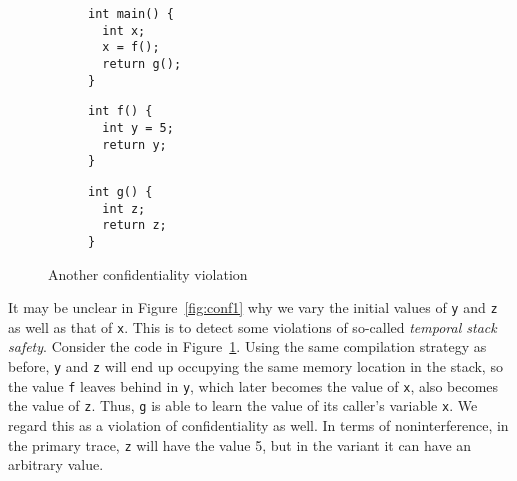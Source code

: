 \documentclass[10pt,conference]{ieeetran}%
\theoremstyle{definition}
\begin{document}
\begin{figure}
\begin{subfigure}[t]{.28\columnwidth}
  {\small
\begin{lstlisting}
int main() {
  int x;
  x = f();
  return g();
}
\end{lstlisting}
  }
\end{subfigure}
\begin{subfigure}[t]{.27\columnwidth}
  {\small
\begin{lstlisting}[backgroundcolor=\color{lgray}]
int f() {
  int y = 5;
  return y;
}
\end{lstlisting}
  }
\end{subfigure}
\begin{subfigure}[t]{.32\columnwidth}
  {\small
\begin{lstlisting}
int g() {
  int z;
  return z;
}
\end{lstlisting}
  }
\end{subfigure}
\caption{Another confidentiality violation}
\label{fig:conf2}
\end{figure}

It may be unclear in Figure~\ref{fig:conf1} why we vary the initial values of {\tt y}
and {\tt z} as well as that of {\tt x}. This is to detect some violations of so-called
{\em temporal stack safety}.
Consider the code in Figure~\ref{fig:conf2}.
Using the same compilation strategy as before, {\tt y} and {\tt z} will end up occupying the
same memory location in the stack,
so the value {\tt f} leaves behind in {\tt y}, which later becomes the value of {\tt x}, also
becomes the value of {\tt z}. Thus, {\tt g} is able to learn the value of its caller's
variable {\tt x}.  We regard this as a violation of confidentiality as well. In terms of noninterference,
in the primary trace, {\tt z} will have the value 5, but in the variant it can have
an arbitrary value.
\end{document}

